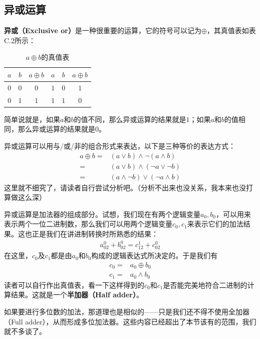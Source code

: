 \subsection*{异或运算}
\textbf{异或（Exclusive or）}是一种很重要的运算，它的符号可以记为$\oplus$，其真值表如表C.2所示：\newline
\begin{table}[htbp]
\centering
\begin{tabular}{ccc|ccc}
\hline\rule{0pt}{2.4ex}
$a$ & $b$ & $a\oplus b$ & $a$ & $b$ & $a\oplus b$\\
\hline\hline\rule{0pt}{2.4ex}
$0$ & $0$ & $0$ & $1$ & $0$ & $1$\\
\hline\rule{0pt}{2.4ex}
$0$ & $1$ & $1$ & $1$ & $1$ & $0$\\
\hline
\end{tabular}
\caption{$a\oplus b$的真值表}
\end{table}
简单说就是，如果$a$和$b$的值不同，那么异或运算的结果就是$1$；如果$a$和$b$的值相同，那么异或运算的结果就是$0$。\par
异或运算可以用与/或/非的组合形式来表达，以下是三种等价的表达方式：
\begin{align*}
a\oplus b={}&(a\lor b)\land\lnot(a\land b)\\
={}&(a\lor b)\land(\lnot a\lor\lnot b)\\
={}&(a\land\lnot b)\lor(\lnot a\land b)
\end{align*}
这里就不细究了，请读者自行尝试分析吧。（分析不出来也没关系，我本来也没打算做这么深）\par
异或运算是加法器的组成部分。试想，我们现在有两个逻辑变量$a_0, b_0$，可以用来表示两个一位二进制数，那么我们可以用两个逻辑变量$c_0, c_1$来表示它们的加法结果。这也正是我们在讲进制转换时所熟悉的结果：
\begin{align*}
a_02^0+b_02^0=c_12^1+c_02^0
\end{align*}
在这里，$c_0$及$c_1$都是由$a_0$和$b_0$构成的逻辑表达式所决定的。于是我们有
\begin{align*}
c_0={}&a_0\oplus b_0\\
c_1={}&a_0\land b_0
\end{align*}
读者可以自行作出真值表，看一下这样得到的$c_0$和$c_1$是否能完美地符合二进制的计算结果。这就是一个\textbf{半加器（Half adder）}。\par
如果要进行多位数的加法，那道理也是相似的——只是我们还不得不使用全加器（Full adder），从而形成多位加法器。这些内容已经超出了本节该有的范围，我们就不多谈了。\par
